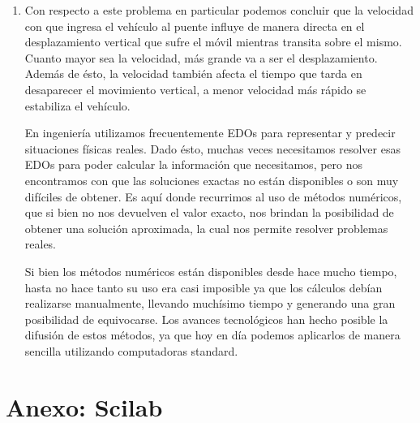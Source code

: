 \documentclass[10.5pt]{article}
\begin{document}
\begin{enumerate}
 \item Con respecto a este problema en particular podemos concluir que la velocidad con que ingresa el vehículo al puente influye de
 manera directa en el desplazamiento vertical que sufre el móvil mientras transita sobre el mismo. Cuanto mayor sea la velocidad, más grande
 va a ser el desplazamiento. Además de ésto, la velocidad también afecta el tiempo que tarda en desaparecer el movimiento vertical, a menor
 velocidad más rápido se estabiliza el vehículo.
 
 En ingeniería utilizamos frecuentemente EDOs para representar y predecir situaciones físicas reales. Dado ésto, muchas veces necesitamos
 resolver esas EDOs para poder calcular la información que necesitamos, pero nos encontramos con que las soluciones exactas no están disponibles
 o son muy difíciles de obtener. Es aquí donde recurrimos al uso de métodos numéricos, que si bien no nos devuelven el valor exacto, nos brindan
 la posibilidad de obtener una solución aproximada, la cual nos permite resolver problemas reales.
 
 Si bien los métodos numéricos están disponibles desde hace mucho tiempo, hasta no hace tanto su uso era casi imposible ya que los cálculos debían
 realizarse manualmente, llevando muchísimo tiempo y generando una gran posibilidad de equivocarse. Los avances tecnológicos han hecho posible la
 difusión de estos métodos, ya que hoy en día podemos aplicarlos de manera sencilla utilizando computadoras standard. 
 \end{enumerate}

\newpage
\section*{Anexo: Scilab}


\end{document}
